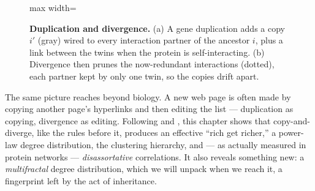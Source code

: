 \begin{figure}[t]
\centering
\begin{adjustbox}{max width=\linewidth}\end{adjustbox}
\caption{\textbf{Duplication and divergence.} (a) A gene duplication adds a copy
$i'$ (gray) wired to every interaction partner of the ancestor $i$, plus a link
between the twins when the protein is self-interacting. (b) Divergence then prunes
the now-redundant interactions (dotted), each partner kept by only one twin, so
the copies drift apart.}
\label{fig:dup-diverge}
\end{figure}

The same picture reaches beyond biology. A new web page is often made by copying
another page's hyperlinks and then editing the list --- duplication as copying,
divergence as editing. Following \citet{vazquez2003} and \citet{vazquez2003pin},
this chapter shows that copy-and-diverge, like the rules before it, produces an
effective ``rich get richer,'' a power-law degree distribution, the clustering
hierarchy, and --- as actually measured in protein networks \citep{maslov2002} ---
\emph{disassortative} correlations. It also reveals something new: a
\emph{multifractal} degree distribution, which we will unpack when we reach it, a
fingerprint left by the act of inheritance.

